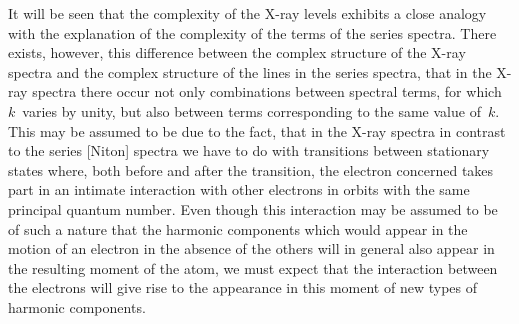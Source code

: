 It will be seen that the complexity of the X-ray levels exhibits a
close analogy with the explanation of the complexity of the terms
of the series spectra. There exists, however, this difference between
the complex structure of the X-ray spectra and the complex
structure of the lines in the series spectra, that in the X-ray
spectra there occur not only combinations between spectral terms,
for which $k$~varies by unity, but also between terms corresponding
to the same value of~$k$. This may be assumed to be
due to the fact, that in the X-ray spectra in contrast to the series
[Niton]
spectra we have to do with transitions between stationary states
where, both before and after the transition, the electron concerned
takes part in an intimate interaction with other electrons in orbits
with the same principal quantum number. Even though this
interaction may be assumed to be of such a nature that the
harmonic components which would appear in the motion of an
electron in the absence of the others will in general also appear
in the resulting moment of the atom, we must expect that the
interaction between the electrons will give rise to the appearance
in this moment of new types of harmonic components.

